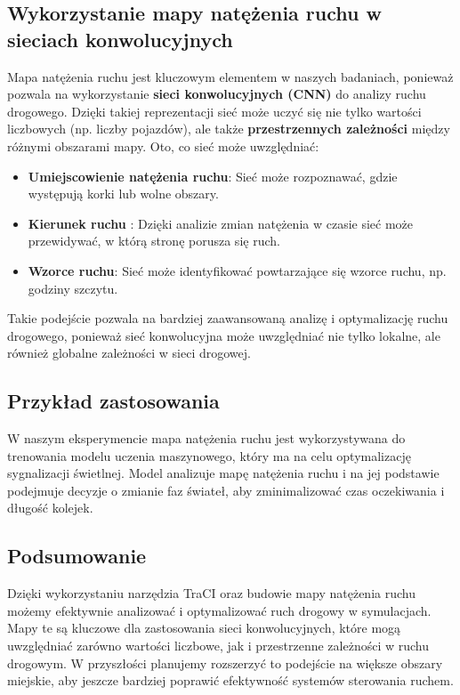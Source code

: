 \documentclass[12pt, a4paper]{article} %
\begin{document}
    \subsection{Wykorzystanie mapy natężenia ruchu w sieciach konwolucyjnych}
    Mapa natężenia ruchu jest kluczowym elementem w naszych badaniach, ponieważ pozwala na wykorzystanie
    \textbf{sieci konwolucyjnych (CNN)}
    do analizy ruchu drogowego. Dzięki takiej reprezentacji sieć może uczyć się nie tylko wartości liczbowych (np.
    liczby pojazdów), ale także \textbf{przestrzennych zależności}
    między różnymi obszarami mapy. Oto, co sieć może uwzględniać:
    \begin{itemize}
        \item \textbf{Umiejscowienie natężenia ruchu}: Sieć może rozpoznawać, gdzie występują korki lub wolne obszary.
        \item \textbf{Kierunek ruchu}
        : Dzięki analizie zmian natężenia w czasie sieć może przewidywać, w którą stronę porusza się ruch.
        \item \textbf{Wzorce ruchu}: Sieć może identyfikować powtarzające się wzorce ruchu, np. godziny szczytu.
    \end{itemize}

    Takie podejście pozwala na bardziej zaawansowaną analizę i optymalizację ruchu drogowego, ponieważ sieć konwolucyjna
    może uwzględniać nie tylko lokalne, ale również globalne zależności w sieci drogowej.

    \subsection{Przykład zastosowania}
    W naszym eksperymencie mapa natężenia ruchu jest wykorzystywana do trenowania modelu uczenia maszynowego, który ma
    na celu optymalizację sygnalizacji świetlnej. Model analizuje mapę natężenia ruchu i na jej podstawie podejmuje
    decyzje o zmianie faz świateł, aby zminimalizować czas oczekiwania i długość kolejek.

    \subsection{Podsumowanie}
    Dzięki wykorzystaniu narzędzia TraCI oraz budowie mapy natężenia ruchu możemy efektywnie analizować i optymalizować
    ruch drogowy w symulacjach. Mapy te są kluczowe dla zastosowania sieci konwolucyjnych, które mogą uwzględniać
    zarówno wartości liczbowe, jak i przestrzenne zależności w ruchu drogowym. W przyszłości planujemy rozszerzyć to
    podejście na większe obszary miejskie, aby jeszcze bardziej poprawić efektywność systemów sterowania ruchem.



    \clearpage
    \printbibliography
\end{document}
